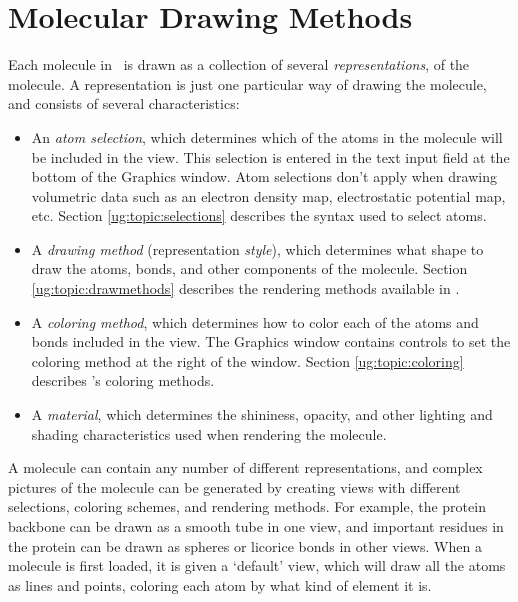 %
%
%


\chapter{Molecular Drawing Methods}
\label{ug:topic:drawing}

Each molecule in \VMD\ is drawn as a collection of several 
{\em representations}, of the molecule.  
A representation is just one particular way of drawing the molecule, 
and consists of several characteristics:
\begin{itemize}
  \item An {\em atom selection}, which determines which of the atoms in the 
molecule will be included in the view.  This selection is entered in the text 
input field at the bottom of the Graphics window.  Atom selections don't apply
when drawing volumetric data such as an electron density map, 
electrostatic potential map, etc.
Section \ref{ug:topic:selections} describes the syntax used to select atoms.

  \item A {\em drawing method} (representation {\em style}), 
which determines what shape to draw the
atoms, bonds, and other components of the molecule.  
Section \ref{ug:topic:drawmethods} 
describes the rendering methods available in \VMD.

  \item A {\em coloring method}, which determines how to color each of the 
atoms and bonds included in the view.  The Graphics window contains controls to 
set the coloring method at the right of the window.
Section \ref{ug:topic:coloring} describes \VMD's coloring methods.

  \item A {\em material}, which determines the shininess, opacity, and
other lighting and shading characteristics used when rendering the molecule.

\end{itemize}
A molecule can contain any number of different representations, and
complex pictures of the molecule can be generated by creating views
with different selections, coloring schemes, and rendering methods.
For example, the protein backbone can be drawn as a smooth tube in one
view, and important residues in the protein can be drawn as spheres or
licorice bonds in other views.  When a molecule is first loaded, it is
given a `default' view, which will draw all the atoms as lines and
points, coloring each atom by what kind of element it is.

